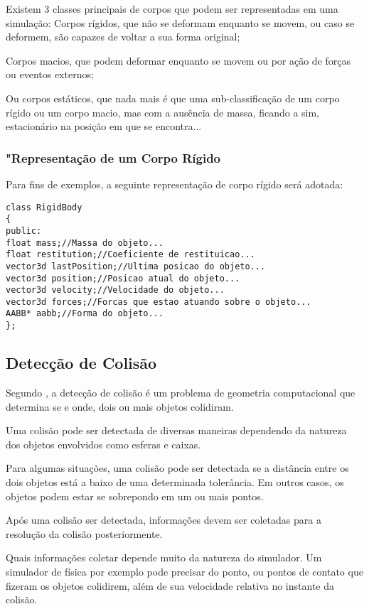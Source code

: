 Existem 3 classes principais de corpos que podem ser representadas em uma simulação:
Corpos rígidos, que não se deformam  enquanto se movem, ou caso se deformem, são capazes de voltar a sua forma original;


Corpos macios, que podem deformar enquanto se movem ou por ação de forças ou eventos externos;

Ou corpos estáticos, que nada mais é que uma sub-classificação de um corpo rígido ou um corpo macio,  mas com a ausência de massa, ficando a sim, estacionário na posição em que se
encontra...

\subsubsection{"Representação de um Corpo Rígido}

Para fins de exemplos, a seguinte representação de corpo rígido será adotada:

\begin{lstlisting}[frame=single,caption=Exemplo de corpo rígido\label{code:RigidBody}]
class RigidBody
{
public:
float mass;//Massa do objeto...
float restitution;//Coeficiente de restituicao...
vector3d lastPosition;//Ultima posicao do objeto...
vector3d position;//Posicao atual do objeto...
vector3d velocity;//Velocidade do objeto...
vector3d forces;//Forcas que estao atuando sobre o objeto...
AABB* aabb;//Forma do objeto...
};
\end{lstlisting}

\subsection{Detecção de Colisão}
Segundo , a detecção de colisão é um problema de geometria computacional que
determina se e onde, dois ou mais objetos colidiram.

Uma colisão pode ser detectada de diversas maneiras dependendo da natureza dos
objetos envolvidos como esferas e caixas.

Para algumas situações, uma colisão
pode ser detectada se a distância entre os dois objetos está a baixo de uma
determinada tolerância. Em outros casos, os objetos podem estar se sobrepondo
em um ou mais pontos.

Após uma colisão ser detectada, informações devem ser coletadas para a
resolução da colisão posteriormente.

Quais informações coletar depende muito da natureza do simulador. Um simulador
de física por exemplo pode precisar do ponto, ou pontos de contato que fizeram
os objetos colidirem, além de sua velocidade relativa no instante da colisão.


